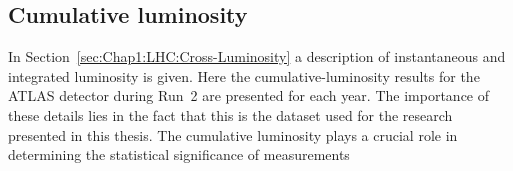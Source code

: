 \begin{comment}
The flow of the data model, as depicted in Figure~\ref{fig:Chap3:Analysis_data_model_ATLAS}, 
involves the use of the derivation framework for data reduction. Within this framework, intermediate 
data products are generated by selectively discarding or incorporating information to the reconstruction output 
(i.e. AOD), while preserving the underlying structure and event data model of the original AOD. 
The analysis framework serves as the final component of the model, providing physicists with 
the means to access the derived data products, apply various combined performance tools, and 
generate the ultimate small NTuples\footnote{Ntuple is a data structure used to store information about each event.}. 
These NTuples serve as the basis for creating plots and 
conducting subsequent statistical analyses. In other words, the AODs are too large to analyse directly 
and hence, the derivation framework reduces them to create the various DAODs (also known as derivations). 
DAODs are still made of xAOD objects, but are much smaller. 
This data model is embedded within
the ATLAS software framework, Athena\footnote{Athena is the framework used for all pre-analysis data processing; it can also be
used for physics analysis.}.


\begin{figure}
 	 \centering
 	  \texttt{[image: Chapter3/ATLAS\_Run\_2\_Analysis\_model]}
	  \caption{Analysis model employed in ATLAS during Run~2. The scheme illustrates the transformation 
	  of the reconstruction output, known as AOD, through the derivation framework. This process results in 
	  the generation of multiple streams of Derived Analysis Object Data (DAOD). The original AOD and the 
	  derived DAOD possess compatible data models, allowing the analysis software to seamlessly use 
	  either format as input~\cite{Brun:1997pa}. In this Figure CP stands for Combined Performance groups}
	\label{fig:Chap3:Analysis_data_model_ATLAS}
\end{figure}
\end{comment}



%
%

\subsection{Cumulative luminosity}
\label{sec:Chap3.1:Data:DeliveredLuminosity}
In Section~\ref{sec:Chap1:LHC:Cross-Luminosity} a description of 
instantaneous and integrated luminosity is given. Here the cumulative-luminosity
results for the ATLAS detector during Run~2 are presented for each year. 
The importance of these details lies in the fact that this is the dataset
used for the research presented in this thesis.
The cumulative luminosity plays a crucial role in determining 
the statistical significance of measurements 

